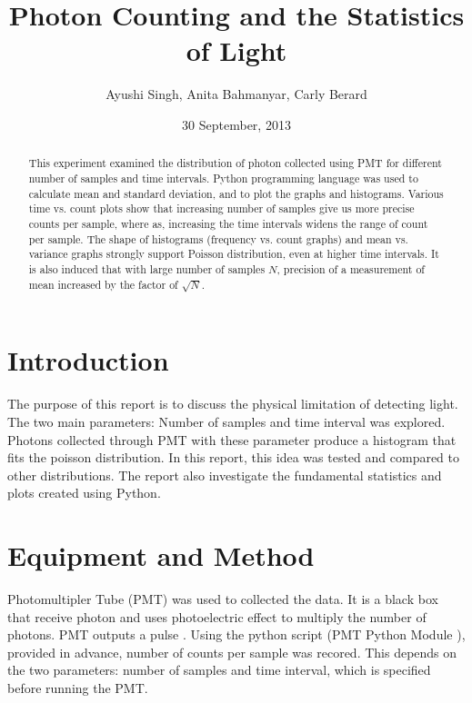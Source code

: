 \documentclass[a4paper,12pt]{article}
\makeatletter
\newcommand{\myemail}{ayushi.singh@mail.utoronto.ca}
\newcommand{\anita}{anita.bahmanyar@mail.utoronto.ca}
\newcommand{\carly}{c.berard@mail.utoronot.ca}
\makeatother
\begin{document}
\onehalfspacing
\title{Photon Counting and the Statistics of Light}
\author{Ayushi Singh, Anita Bahmanyar, Carly Berard}
\affil{\small {\myemail}}%
\date{30 September, 2013}
\maketitle

\begin{abstract}
\label{abstract}
This experiment examined the distribution of photon collected using PMT for different number of samples and time intervals. Python programming language was used to calculate mean and standard deviation, and to plot the graphs and histograms. Various time vs. count plots show that increasing number of samples give us more precise counts per sample, where as, increasing the time intervals widens the range of count per sample. The shape of histograms (frequency vs. count graphs) and mean vs. variance graphs strongly support Poisson distribution, even at higher time intervals. It is also induced that with large number of samples ${N}$, precision of a measurement of mean increased  by the factor of $\sqrt{N}$. 
\end{abstract}

\section{Introduction}
\label{sec:introduction}
The purpose of this report is to discuss the physical limitation of detecting light. The two main parameters: Number of samples and time interval was explored. Photons collected through PMT with these parameter produce a histogram that fits the poisson distribution. In this report, this idea was tested and compared to other distributions. The report also investigate the fundamental statistics and plots created using Python.

\section{Equipment and Method}
\label{sec:equipment}
Photomultipler Tube (PMT) was used to collected the data. It is a black box that receive photon and uses photoelectric effect to multiply the number of photons. PMT outputs a pulse \citep{PMT}. Using the python script (PMT Python Module \citep{Module}), provided in advance, number of counts per sample was recored. This depends on the two parameters: number of samples and time interval, which is specified before running the PMT.
\end{document}
